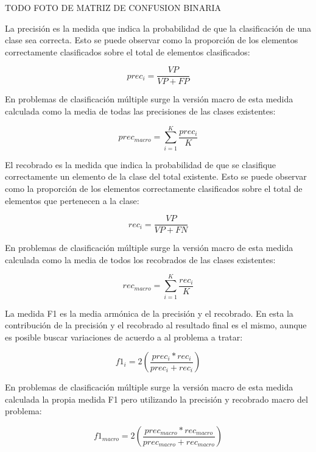 TODO FOTO DE MATRIZ DE CONFUSION BINARIA

La precisión es la medida que indica la probabilidad de que la clasificación de una clase sea correcta. Esto 
se puede observar como la proporción de los elementos correctamente clasificados sobre el total de 
elementos clasificados:

\begin{equation}
	prec_i = \frac{VP}{VP + FP}
\end{equation}

En problemas de clasificación múltiple surge la versión macro de esta medida calculada como la media de todas
las precisiones de las clases existentes:

\begin{equation}
	prec_{macro} = \sum^K_{i=1} \frac{prec_i}{K}
\end{equation}

El recobrado es la medida que indica la probabilidad de que se clasifique correctamente un elemento de la clase
del total existente. Esto se puede observar como la proporción de los elementos correctamente clasificados sobre el 
total de elementos que pertenecen a la clase:

\begin{equation}
	rec_i = \frac{VP}{VP + FN}
\end{equation}

En problemas de clasificación múltiple surge la versión macro de esta medida calculada como la media de todos
los recobrados de las clases existentes:

\begin{equation}
	rec_{macro} = \sum^K_{i=1} \frac{rec_i}{K}
\end{equation}

La medida F1 es la media armónica de la precisión y el recobrado. En esta la contribución de la precisión y el
recobrado al resultado final es el mismo, aunque es posible buscar variaciones de acuerdo a al problema a tratar:

\begin{equation}
	f1_i = 2 (\frac{prec_i * rec_i}{prec_i + rec_i})
\end{equation}

En problemas de clasificación múltiple surge la versión macro de esta medida calculada la propia medida F1 pero
utilizando la precisión y recobrado macro del problema:

\begin{equation}
	f1_{macro} = 2 (\frac{prec_{macro} * rec_{macro}}{prec_{macro} + rec_{macro}})
\end{equation}

